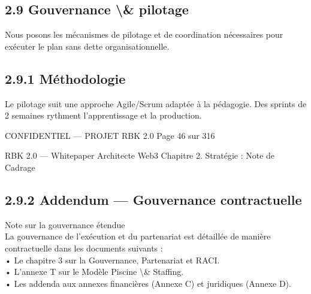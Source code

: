 \documentclass[12pt,landscape,a4paper]{article}
\newenvironment{confidential}
{\begin{tcolorbox}[
    colback=rbkred!5!white,
    colframe=rbkred!75!black,
    title=CONFIDENTIEL,
    fonttitle=\bfseries\color{white},
    coltitle=rbkred!75!black,
    breakable,
    enhanced,
    frame hidden,
    borderline west={2pt}{0pt}{rbkred!75!black}
]}
{\end{tcolorbox}}
\begin{document}
\subsection{2.9 Gouvernance \textbackslash{}& pilotage}
Nous posons les mécanismes de pilotage et de coordination nécessaires pour exécuter le plan sans dette organisationnelle.\\
\vspace{0.5em}
\vspace{0.5em}
\subsection{2.9.1 Méthodologie}
Le pilotage suit une approche Agile/Scrum adaptée à la pédagogie. Des sprints de 2 semaines rythment l’apprentissage et la production.\\
\vspace{0.5em}
\vspace{0.5em}
\vspace{0.5em}
\vspace{0.5em}
\begin{confidential}CONFIDENTIEL — PROJET RBK 2.0                                            Page 46 sur 316\end{confidential}
RBK 2.0 — Whitepaper Architecte Web3                                                                                      Chapitre 2. Stratégie : Note de Cadrage\\
\vspace{0.5em}
\vspace{0.5em}
\subsection{2.9.2 Addendum — Gouvernance contractuelle}
\vspace{0.5em}
Note sur la gouvernance étendue\\
\vspace{0.5em}
La gouvernance de l’exécution et du partenariat est détaillée de manière contractuelle dans les documents suivants :\\
• Le chapitre 3 sur la Gouvernance, Partenariat et RACI.\\
• L’annexe T sur le Modèle Piscine \textbackslash{}& Staffing.\\
• Les addenda aux annexes financières (Annexe C) et juridiques (Annexe D).\\
\vspace{0.5em}
\vspace{0.5em}
\vspace{0.5em}
\vspace{0.5em}
\end{document}
